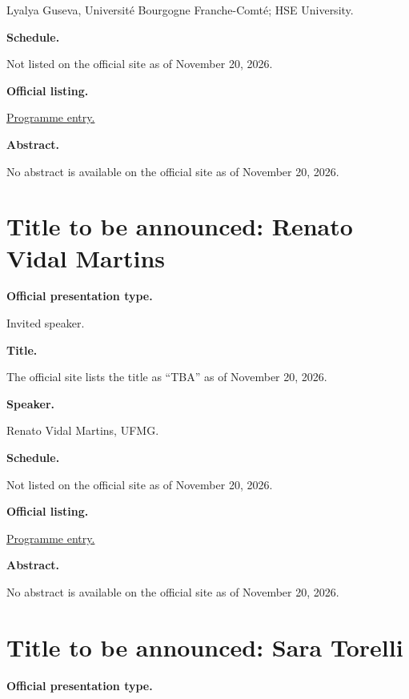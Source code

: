 Lyalya Guseva, Université Bourgogne
Franche-Comté; HSE University.

\medskip\noindent
{\bf Schedule.}

Not listed on the official site as of
November 20, 2026.

\medskip\noindent
{\bf Official listing.}

\href{%
https://sites.google.com/view/%
geoalgcompluff/legal/%
legal-2027-resumos#h.59gubrdmgdxn%
}{Programme entry.}

\medskip\noindent
{\bf Abstract.}

No abstract is available on the
official site as of November 20, 2026.

\section{Title to be announced: Renato Vidal
Martins}
\label{section-tba-martins}

\medskip\noindent
{\bf Official presentation type.}

Invited speaker.

\medskip\noindent
{\bf Title.}

The official site lists the title as
``TBA'' as of November 20, 2026.

\medskip\noindent
{\bf Speaker.}

Renato Vidal Martins, UFMG.

\medskip\noindent
{\bf Schedule.}

Not listed on the official site as of
November 20, 2026.

\medskip\noindent
{\bf Official listing.}

\href{%
https://sites.google.com/view/%
geoalgcompluff/legal/%
legal-2027-resumos#h.59gubrdmgdxn%
}{Programme entry.}

\medskip\noindent
{\bf Abstract.}

No abstract is available on the
official site as of November 20, 2026.

\section{Title to be announced: Sara Torelli}
\label{section-tba-torelli}

\medskip\noindent
{\bf Official presentation type.}

